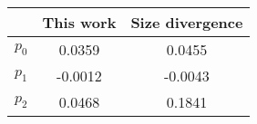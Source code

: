 \begin{tabular}{l|cc}
\hline
~ & This work & Size divergence \cite{Ho2016a} \\ \hline
$p_0$ & 0.0359 & 0.0455 \\
$p_1$ & -0.0012 & -0.0043 \\
$p_2$ & 0.0468 & 0.1841 \\ \hline

\end{tabular}
